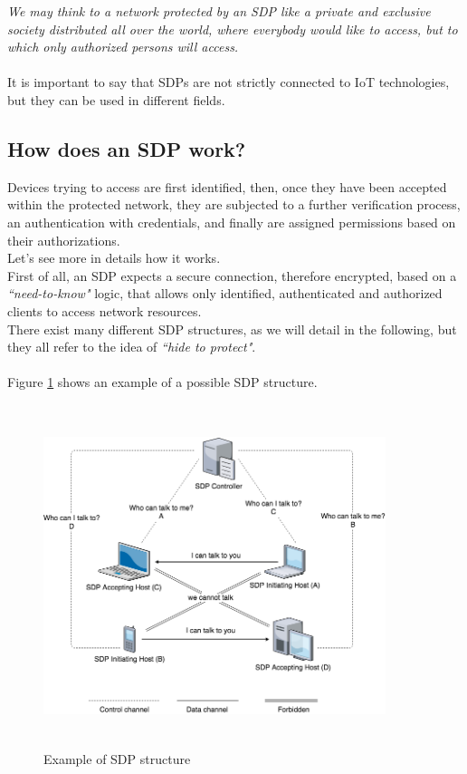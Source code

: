 \documentclass[12pt]{report}
\begin{document}
{{\emph{We may think to a network protected by an SDP like a private and exclusive society distributed all over the world, where everybody would like to access, but to which only authorized persons will access.}~\cite{protectnetwithsdp}\\\\
It is important to say that SDPs are not strictly connected to IoT technologies, but they can be used in different fields.\\

\subsection{How does an SDP work?}
\bigskip

Devices trying to access are first identified, then, once they have been accepted within the protected network, they are subjected to a further verification process, an authentication with credentials, and finally are assigned permissions based on their authorizations.\\
Let's see more in details how it works.\\

First of all, an SDP expects a secure connection, therefore encrypted, based on a \emph{``need-to-know"} logic, that allows only identified, authenticated and authorized clients to access network resources.\\
There exist many different SDP structures, as we will detail in the following, but they all refer to the idea of \emph{``hide to protect"}.\\\\

Figure \ref{fig:sdpstructure} shows an example of a possible SDP structure.

\begin{figure}[H]
\includegraphics[width=10cm,height=10cm,keepaspectratio]{sdp_structure1}
\centering
\caption{Example of  SDP structure}
\label{fig:sdpstructure}
\end{figure}

}}
\end{document}
